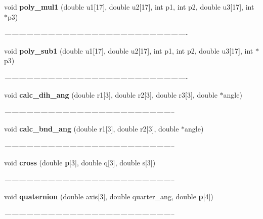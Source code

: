 \begin{CompactItemize}
void {\bf poly\_\-mul1} (double u1[17], double u2[17], int p1, int p2, double u3[17], int $\ast$p3)
\begin{CompactList}\small\item\em ---------------------------------------------------------------------------- \item\end{CompactList}\item 
void {\bf poly\_\-sub1} (double u1[17], double u2[17], int p1, int p2, double u3[17], int $\ast$p3)
\begin{CompactList}\small\item\em ---------------------------------------------------------------------------- \item\end{CompactList}\item 
void {\bf calc\_\-dih\_\-ang} (double r1[3], double r2[3], double r3[3], double $\ast$angle)
\begin{CompactList}\small\item\em ----------------------------------------------------------------------- \item\end{CompactList}\item 
void {\bf calc\_\-bnd\_\-ang} (double r1[3], double r2[3], double $\ast$angle)
\begin{CompactList}\small\item\em ----------------------------------------------------------------------- \item\end{CompactList}\item 
void {\bf cross} (double {\bf p}[3], double q[3], double s[3])
\begin{CompactList}\small\item\em ----------------------------------------------------------------------- \item\end{CompactList}\item 
void {\bf quaternion} (double axis[3], double quarter\_\-ang, double {\bf p}[4])
\begin{CompactList}\small\item\em ----------------------------------------------------------------------- \item\end{CompactList}\end{CompactItemize}
